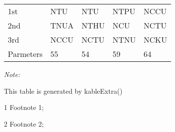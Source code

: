 \begin{table}
\begin{threeparttable}
\begin{tabular}[t]{lllll}
\hspace{1em}1st & NTU & NTU & NTPU & NCCU\\
\hspace{1em}2nd & TNUA & NTHU & NCU & NCTU\\
\hspace{1em}3rd & NCCU & NCTU & NTNU & NCKU\\
Parmeters & 55 & 54 & 59 & 64\\
\bottomrule
\end{tabular}
\begin{tablenotes}
\item \textit{Note: } 
\item This table is generated by kableExtra()
\item[1] Footnote 1; 
\item[2] Footnote 2; 
\end{tablenotes}
\end{threeparttable}
\end{table}
